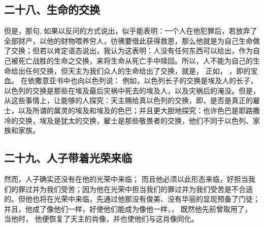 
\subsection{二十八、生命的交换}

但是，那句, 如果以反问的方式说出，似乎能表明：一个人在他犯罪后，若放弃了全部财产，以他的财物喂养穷人，彷彿要借此获得救恩，那么他就是为自己生命做了交换；但若以肯定语态说出，我认为这表明：人没有任何东西可以给出，作为自己被死亡战胜的生命之交换，来将生命从死亡手中赎回。所以，人不能为自己的生命给出任何交换，但天主为我们众人的生命给出了交换，就是， 正如， ，即的宝血。 在依撒意亚书中也向以色列说：  例如，以色列长子的交换是埃及人的长子，以色列的交换是那些在埃及最后灾祸中死去的埃及人，以及灾祸后的淹没。但是，从这些事情上，让能够的人探究：天主赐给真以色列的交换，即，是否是真正的雇士，以及所谓的属灵的埃及和埃及的色巴；并且更大胆地探究：也许色巴是耶路撒冷的交换，埃及是犹太的交换，雇士是那些敬畏者的交换，他们不同于以色列、家族和家族。\par


\subsection{二十九、人子带着光荣来临}

  然而，人子确实还没有在他的光荣中来临；  而且他必须以此形态来临，好担当我们的罪过并为我们受苦；因为他在光荣中担当我们的罪过并为我们受苦是不合适的。但他也将在光荣中来临，先通过他那没有俊美、没有华丽的显现预备了门徒；并且，他成了像他们一样，好使他们能成为像他一样，， 既然他先前曾取用了， 当他时， 他便恢复了天主的肖像，并也使他们与这肖像同化。\par

